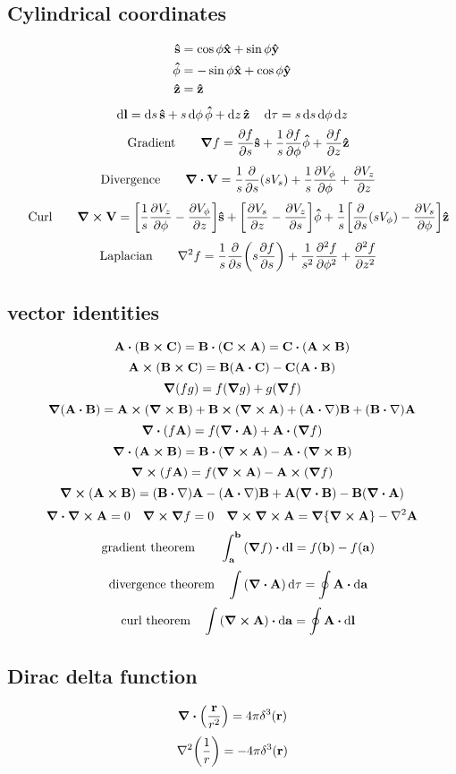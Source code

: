 \documentclass[12pt]{article}
\begin{document}
\subsection*{Cylindrical coordinates}
\begin{align*}
\vu{s}&=\cos\phi\vu{x}+\sin\phi\vu{y}\\
\vu{\phi}&=-\sin\phi\vu{x}+\cos\phi\vu{y}\\
\vu{z}&=\vu{z}
\end{align*}
\[\dd{\vb{l}}=\dd{s}\vu{\vb{s}}+s\dd{\phi}\vu{\vb{\phi}}+\dd{z}\vu{\vb{z}}\quad\dd{\tau}=s\dd{s}\dd{\phi}\dd{z}\]
\[\qq{Gradient}\quad\grad{f}=\pdv{f}{s}\vu{\vb{s}}+\frac{1}{s}\pdv{f}{\phi}\vu{\vb{\phi}}+\pdv{f}{z}\vu{\vb{z}}\]
\[\qq{Divergence}\quad\div{\vb{V}}=\frac{1}{s}\pdv{s}\qty(sV_s)+\frac{1}{s}\pdv{V_{\phi}}{\phi}+\pdv{V_z}{z}\]
\[\qq{Curl}\quad\curl{\vb{V}}=\bqty{\frac{1}{s}\pdv{V_z}{\phi}-\pdv{V_{\phi}}{z}}\vu{\vb{s}}+\bqty{\pdv{V_s}{z}-\pdv{V_z}{s}}\vu{\vb{\phi}}+\frac{1}{s}\bqty{\pdv{s}\qty(sV_{\phi})-\pdv{V_s}{\phi}}\vu{\vb{z}}\]
\[\qq{Laplacian}\quad\laplacian{f}=\frac{1}{s}\pdv{s}\qty(s\pdv{f}{s})+\frac{1}{s^2}\pdv[2]{f}{\phi}+\pdv[2]{f}{z}\]
\subsection*{vector identities}
\[\vb{A}\vdot\qty(\vb{B}\cp\vb{C})=\vb{B}\vdot\qty(\vb{C}\cp\vb{A})=\vb{C}\vdot\qty(\vb{A}\cp\vb{B})\]
\[\vb{A}\cp\qty(\vb{B}\cp\vb{C})=\vb{B}\qty(\vb{A}\vdot\vb{C})-\vb{C}\qty(\vb{A}\vdot\vb{B})\]
\[\grad{(fg)}=f(\grad{g})+g(\grad{f})\]
\[\grad{(\vb{A}\vdot\vb{B})}=\vb{A}\cp\qty(\curl{\vb{B}})+\vb{B}\cp\qty(\curl{\vb{A}})+\qty(\vb{A}\vdot\nabla)\vb{B}+\qty(\vb{B}\vdot\nabla)\vb{A}\]
\[\div{\qty(f\vb{A})}=f(\div{\vb{A}})+\vb{A}\vdot\qty(\grad{f})\]
\[\div{\qty(\vb{A}\cp\vb{B})}=\vb{B}\vdot\qty(\curl{\vb{A}})-\vb{A}\vdot\qty(\curl{\vb{B}})\]
\[\curl{\qty(f\vb{A})}=f(\curl{\vb{A}})-\vb{A}\cp\qty(\grad{f})\]
\[\curl{(\vb{A}\cp\vb{B})}=\qty(\vb{B}\vdot\nabla)\vb{A}-\qty(\vb{A}\vdot\nabla)\vb{B}+\vb{A}\qty(\div{\vb{B}})-\vb{B}\qty(\div{\vb{A}})\]
\[\div{\curl{\vb{A}}}=0\quad\curl{\grad{f}}=0\quad\curl{\curl{\vb{A}}}=\grad\qty{\curl{\vb{A}}}-\laplacian{\vb{A}}\]
\[\qq{gradient theorem}\quad \int_{\vb{a}}^{\vb{b}}\qty(\grad{f})\vdot\dd{\vb{l}}=f(\vb{b})-f(\vb{a})\]
\[\qq{divergence theorem} \int\qty(\div{\vb{A}})\dd{\tau}=\oint\vb{A}\vdot\dd{\vb{a}}\]
\[\qq{curl theorem} \int\qty(\curl{\vb{A}})\vdot\dd{\vb{a}}=\oint\vb{A}\vdot\dd{\vb{l}}\]

\subsection*{Dirac delta function}
\[\div{\qty(\frac{\vb{r}}{r^2})}=4\pi\delta^3(\vb{r})\]
\[\laplacian{\qty(\frac{1}{r})}=-4\pi\delta^3(\vb{r})\]
\end{document}

